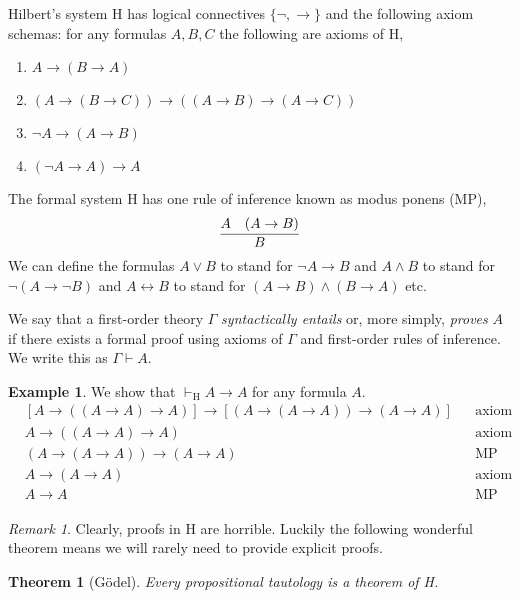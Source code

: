 \documentclass[12pt, leqno]{article}
\newcommand{\proves}{\vdash}
\newenvironment{definition}[1][Definition:]{\begin{trivlist}
\item[\hskip \labelsep {\bfseries #1}]}{\end{trivlist}}
\theoremstyle{theorem}
\newtheorem{theorem}{Theorem}[section]
\theoremstyle{definition}
\theoremstyle{definition}
\theoremstyle{remark}
\theoremstyle{definition}
\newtheorem{example}{Example}[section]
\theoremstyle{remark}
\newtheorem{remark}{Remark}[subsection]
\begin{document}
\begin{definition}
Hilbert's system H has logical connectives $\{\neg, \to\}$ and the following axiom schemas: for any formulas $A, B, C$ the following are axioms of H,
\begin{enumerate}
\item[(H1)] $A \to (B \to A)$
\item[(H2)] $(A \to (B \to C)) \to ((A \to B) \to (A \to C))$
\item[(H3)] $\neg A \to (A \to B)$
\item[(H4)] $(\neg A \to A) \to A$
\end{enumerate} 
The formal system H has one rule of inference known as modus ponens (MP),
\[ \infer{B}{A & (A \rightarrow B)} \]
We can define the formulas $A \vee B$ to stand for $\neg A \to B$ and $A \wedge B$ to stand for $\neg (A \to \neg B)$ and $A \leftrightarrow B$ to stand for $(A \to B) \wedge (B \to A)$ etc. 
\end{definition} 

\begin{definition}
We say that a first-order theory $\Gamma$ \textit{syntactically entails} or, more simply, \textit{proves} $A$ if there exists a formal proof using axioms of $\Gamma$ and first-order rules of inference. We write this as $\Gamma \proves A$.
\end{definition}

\begin{example}
We show that $\proves_{\text{H}} A \to A$ for any formula $A$. 
\begin{align}
& [A \to ((A \to A) \to A)] \to [(A \to (A \to A)) \to (A \to A)]  && \text{axiom (L2)}
\\
& A \to ((A \to A) \to A)  && \text{axiom (L1)}
\\
& (A \to (A \to A)) \to (A \to A)  && \text{MP 1,2}
\\
& A \to (A \to A)  && \text{axiom (L1)}
\\
& A \to A && \text{MP 3,4}
\end{align} 
\end{example}

\begin{remark}
Clearly, proofs in H are horrible. Luckily the following wonderful theorem means we will rarely need to provide explicit proofs. 
\end{remark}

\begin{theorem}[G\"{o}del]
Every propositional tautology is a theorem of H.
\end{theorem}
\end{document}
